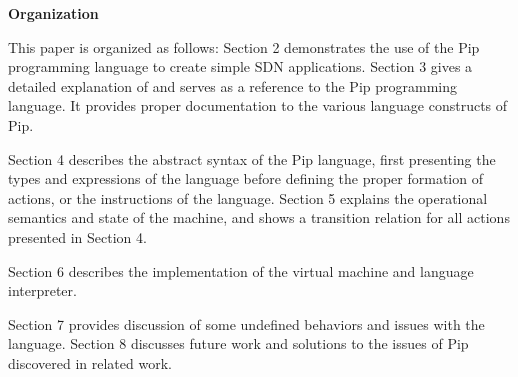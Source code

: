 \textbf{Organization}

This paper is organized as follows: Section 2 demonstrates the use of the Pip programming language to create simple SDN applications. Section 3 gives a detailed explanation of and serves as a reference to the Pip programming language. It provides proper documentation to the various language constructs of Pip.

Section 4 describes the abstract syntax of the Pip language, first presenting the types and expressions of the language before defining the proper formation of actions, or the instructions of the language. Section 5 explains the operational semantics and state of the machine, and shows a transition relation for all actions presented in Section 4.

Section 6 describes the implementation of the virtual machine and language interpreter.

Section 7 provides discussion of some undefined behaviors and issues with the language. Section 8 discusses future work and solutions to the issues of Pip discovered in related work.
